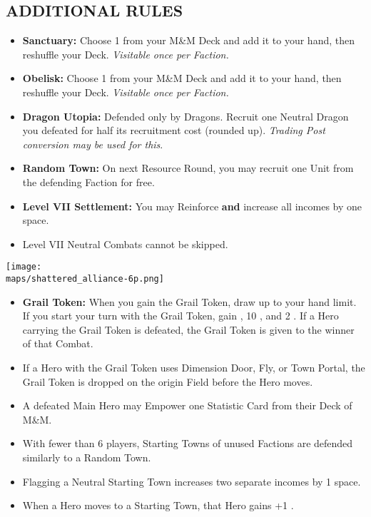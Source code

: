 \begin{multicols*}{2}
\subsection*{\MakeUppercase{Additional Rules}}
\begin{itemize}
  \item \textbf{Sanctuary:} Choose 1  from your M\&M Deck and add it to your hand, then reshuffle your Deck. \textit{Visitable once per Faction.}
  \item \textbf{Obelisk:} Choose 1  from your M\&M Deck and add it to your hand, then reshuffle your Deck. \textit{Visitable once per Faction.}
  \item \textbf{Dragon Utopia:} Defended only by Dragons. Recruit one Neutral Dragon you defeated for half its recruitment cost (rounded up). \textit{Trading Post conversion may be used for this}.
  \item \textbf{Random Town:} On next Resource Round, you may recruit one Unit from the defending Faction for free.
  \item \textbf{Level VII Settlement:} You may Reinforce \textbf{and} increase all incomes by one space.
  \item Level VII Neutral Combats cannot be skipped.
\end{itemize}

\begin{center}
  \vspace*{\fill}
  \texttt{[image: \\maps/shattered\_alliance-6p.png]}
  \vspace*{\fill}
\end{center}

\columnbreak

\begin{itemize}
  \item \textbf{Grail Token:} When you gain the Grail Token, draw up to your hand limit. If you start your turn with the Grail Token, gain , 10 , and 2 . If a Hero carrying the Grail Token is defeated, the Grail Token is given to the winner of that Combat.
  \item If a Hero with the Grail Token uses Dimension Door, Fly, or Town Portal, the Grail Token is dropped on the origin Field before the Hero moves.
  \item A defeated Main Hero may Empower one Statistic Card from their Deck of M\&M.
  \item With fewer than 6 players, Starting Towns of unused Factions are defended similarly to a Random Town.
  \item Flagging a Neutral Starting Town increases two separate incomes by 1 space.
  \item When a Hero moves to a Starting Town, that Hero gains +1 .
\end{itemize}


\end{multicols*}
